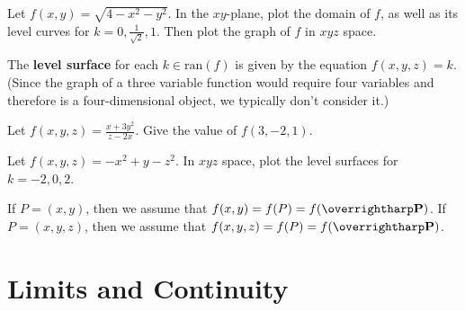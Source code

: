 \documentclass[letterpaper, twoside, 12pt]{book}
\begin{document}
          \begin{solution}

          \end{solution}

          \begin{problem}
            Let $f(x,y)=\sqrt{4-x^2-y^2}$. In the $xy$-plane,
            plot the domain of $f$,
            as well as its level curves for $k=0,\frac{1}{\sqrt{2}},1$.
            Then plot the graph of $f$ in $xyz$ space.
          \end{problem}

          \begin{solution}

          \end{solution}

\begin{definition}
  The \textbf{level surface} for each $k\in\text{ran}(f)$ is given by the
  equation $f(x,y,z)=k$.
  (Since the graph of a three variable function would require four
  variables and therefore is a four-dimensional object, we typically
  don't consider it.)
\end{definition}

          \begin{problem}
            Let $f(x,y,z)=\frac{x+3y^2}{z-2x}$. Give the value of $f(3,-2,1)$.
          \end{problem}

          \begin{solution}

          \end{solution}

          \begin{problem}
            Let $f(x,y,z)=-x^2+y-z^2$. In $xyz$ space, plot the level
            surfaces for $k=-2,0,2$.
          \end{problem}

          \begin{solution}

          \end{solution}

\begin{remark}
  If $P=(x,y)$, then we assume that $f(x,y)=f(P)=f(\vect{P})$.
  If $P=(x,y,z)$, then we assume that $f(x,y,z)=f(P)=f(\vect{P})$.
\end{remark}


\section{Limits and Continuity} %
\end{document}
